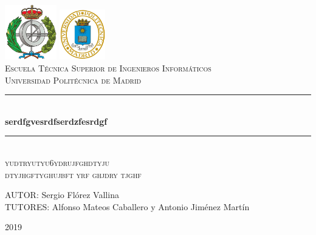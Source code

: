 \documentclass[spanish,12pt, a4paper,twoside]{paper}
\begin{document}
	\begin{titlepage}
		
		\newcommand{\HRule}{\rule{\linewidth}{0.5mm}} %
		
		\center %
		
		\includegraphics[width=2.25cm]{recursos/logoFi.png}
		\hspace{8cm}
		\includegraphics[width=2cm]{recursos/logoupm.png}
		\\[1cm]
		
		\textsc{\Large Escuela Técnica Superior de Ingenieros Informáticos}\\[0.5cm]
		\textsc{\large Universidad Politécnica de Madrid}
		\\[3cm]
		
		
		\HRule \\[0.4cm]
		{ \huge \bfseries serdfgvesrdfserdzfesrdgf}\\[0.4cm] %
		\HRule \\[2.5cm]
		
		\textsc{\LARGE yudtryutyu6ydrujfghdtyju}\\[0.5cm] 
		\textsc{\Large dtyjhgftyghujbft yrf ghjdry tjghf }\\[2.5cm]
		
		\begin{flushright}
			\large
			AUTOR: Sergio Flórez Vallina\\
			TUTORES: Alfonso Mateos Caballero y \linebreak
			Antonio Jiménez Martín
		\end{flushright}
		
		\vspace{1.3cm}
		
		{ {2019}}\\[3cm]
		
		\vfill %
		
	\end{titlepage}
	
\end{document}
